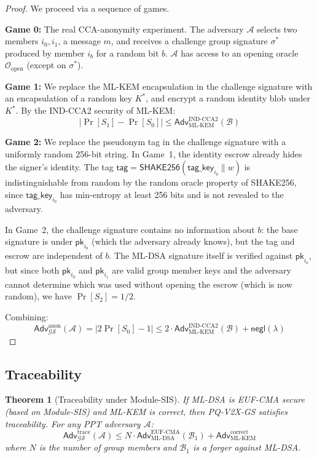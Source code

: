 \documentclass[conference,10pt]{IEEEtran}
\newcommand{\shake}{\textsf{SHAKE256}}
\newcommand{\MSIS}{\textsf{Module-SIS}}
\newcommand{\secparam}{\lambda}
\newcommand{\advA}{\mathcal{A}}
\newcommand{\advB}{\mathcal{B}}
\newcommand{\negl}{\mathsf{negl}}
\newtheorem{theorem}{Theorem}
\begin{document}
\begin{proof}
We proceed via a sequence of games.

\textbf{Game 0:} The real CCA-anonymity experiment. The adversary $\advA$ selects two members $i_0, i_1$, a message $m$, and receives a challenge group signature $\sigma^*$ produced by member $i_b$ for a random bit $b$. $\advA$ has access to an opening oracle $\mathcal{O}_{\mathrm{open}}$ (except on $\sigma^*$).

\textbf{Game 1:} We replace the ML-KEM encapsulation in the challenge signature with an encapsulation of a random key $K^*$, and encrypt a random identity blob under $K^*$. By the IND-CCA2 security of ML-KEM:
\begin{equation}
|\Pr[S_1] - \Pr[S_0]| \leq \mathsf{Adv}^{\mathrm{IND\text{-}CCA2}}_{\mathrm{ML\text{-}KEM}}(\advB)
\end{equation}

\textbf{Game 2:} We replace the pseudonym tag in the challenge signature with a uniformly random 256-bit string. In Game~1, the identity escrow already hides the signer's identity. The tag $\mathsf{tag} = \shake(\mathsf{tag\_key}_{i_b} \| w)$ is indistinguishable from random by the random oracle property of \shake{}, since $\mathsf{tag\_key}_{i_b}$ has min-entropy at least 256 bits and is not revealed to the adversary.

In Game~2, the challenge signature contains no information about $b$: the base signature is under $\mathsf{pk}_{i_b}$ (which the adversary already knows), but the tag and escrow are independent of $b$. The ML-DSA signature itself is verified against $\mathsf{pk}_{i_b}$, but since both $\mathsf{pk}_{i_0}$ and $\mathsf{pk}_{i_1}$ are valid group member keys and the adversary cannot determine which was used without opening the escrow (which is now random), we have $\Pr[S_2] = 1/2$.

Combining:
\begin{equation}
\mathsf{Adv}^{\mathrm{anon}}_{\mathcal{GS}}(\advA) = |2\Pr[S_0] - 1| \leq 2 \cdot \mathsf{Adv}^{\mathrm{IND\text{-}CCA2}}_{\mathrm{ML\text{-}KEM}}(\advB) + \negl(\secparam)
\end{equation}
\end{proof}

\subsection{Traceability}

\begin{theorem}[Traceability under Module-SIS]
\label{thm:traceability}
If ML-DSA is EUF-CMA secure (based on \MSIS{}) and ML-KEM is correct, then PQ-V2X-GS satisfies traceability. For any PPT adversary $\advA$:
\begin{equation}
\mathsf{Adv}^{\mathrm{trace}}_{\mathcal{GS}}(\advA) \leq N \cdot \mathsf{Adv}^{\mathrm{EUF\text{-}CMA}}_{\mathrm{ML\text{-}DSA}}(\advB_1) + \mathsf{Adv}^{\mathrm{correct}}_{\mathrm{ML\text{-}KEM}}
\end{equation}
where $N$ is the number of group members and $\advB_1$ is a forger against ML-DSA.
\end{theorem}
\end{document}
